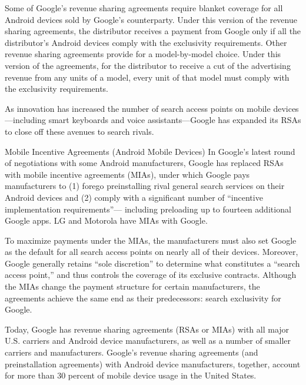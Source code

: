 \documentclass[11pt,b5paper]{scrartcl}
\begin{document}

Some of Google’s revenue sharing agreements require blanket coverage for all
Android devices sold by Google’s counterparty. Under this version of the revenue sharing
agreements, the distributor receives a payment from Google only if all the distributor’s Android
devices comply with the exclusivity requirements. Other revenue sharing agreements provide for
a model-by-model choice. Under this version of the agreements, for the distributor to receive a
cut of the advertising revenue from any units of a model, every unit of that model must comply
with the exclusivity requirements.


As innovation has increased the number of search access points on mobile
devices—including smart keyboards and voice assistants—Google has expanded its RSAs to
close off these avenues to search rivals.




Mobile Incentive Agreements (Android Mobile Devices)
In Google’s latest round of negotiations with some Android manufacturers,
Google has replaced RSAs with mobile incentive agreements (MIAs), under which Google pays
manufacturers to (1) forego preinstalling rival general search services on their Android devices
and (2) comply with a significant number of “incentive implementation requirements”—
including preloading up to fourteen additional Google apps. LG and Motorola have MIAs with
Google.


To maximize payments under the MIAs, the manufacturers must also set Google
as the default for all search access points on nearly all of their devices. Moreover, Google
generally retains “sole discretion” to determine what constitutes a “search access point,” and thus
controls the coverage of its exclusive contracts. Although the MIAs change the payment
structure for certain manufacturers, the agreements achieve the same end as their predecessors:
search exclusivity for Google.


Today, Google has revenue sharing agreements (RSAs or MIAs) with all major
U.S. carriers and Android device manufacturers, as well as a number of smaller carriers and
manufacturers. Google’s revenue sharing agreements (and preinstallation agreements) with
Android device manufacturers, together, account for more than 30 percent of mobile device
usage in the United States.
\end{document}
